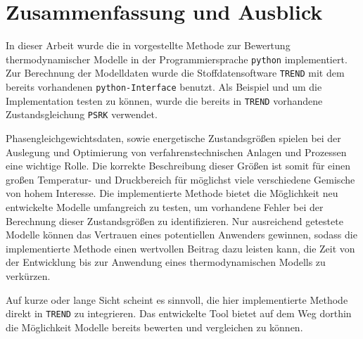 \documentclass[../thesis.tex]{subfiles}
\begin{document}
\chapter{Zusammenfassung und Ausblick}

In dieser Arbeit wurde die in \cite{jaubert2020benchmark} vorgestellte Methode zur Bewertung thermodynamischer Modelle in der Programmiersprache \texttt{python} implementiert. Zur Berechnung der Modelldaten wurde die Stoffdatensoftware \texttt{TREND} mit dem bereits vorhandenen \texttt{python-Interface} benutzt. Als Beispiel und um die Implementation testen zu können, wurde die bereits in \texttt{TREND} vorhandene Zustandsgleichung \texttt{PSRK} verwendet.

Phasengleichgewichtsdaten, sowie energetische Zustandsgrößen spielen bei der Auslegung und Optimierung von verfahrenstechnischen Anlagen und Prozessen eine wichtige Rolle. Die korrekte Beschreibung dieser Größen ist somit für einen großen Temperatur- und Druckbereich für möglichst viele verschiedene Gemische von hohem Interesse. Die implementierte Methode bietet die Möglichkeit neu entwickelte Modelle umfangreich zu testen, um vorhandene Fehler bei der Berechnung dieser Zustandsgrößen zu identifizieren. Nur ausreichend getestete Modelle können das Vertrauen eines potentiellen Anwenders gewinnen, sodass die implementierte Methode einen wertvollen Beitrag dazu leisten kann, die Zeit von der Entwicklung bis zur Anwendung eines thermodynamischen Modells zu verkürzen.

Auf kurze oder lange Sicht scheint es sinnvoll, die hier implementierte Methode direkt in \texttt{TREND} zu integrieren. Das entwickelte Tool bietet auf dem Weg dorthin die Möglichkeit Modelle bereits bewerten und vergleichen zu können.
\end{document}

